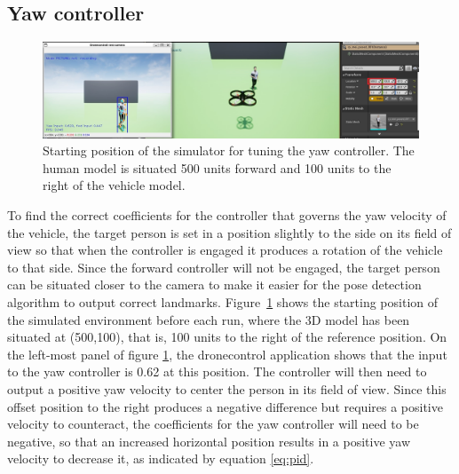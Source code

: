 \subsection{Yaw controller}


\begin{figure}
  \centering
  \includegraphics[width=\textwidth, keepaspectratio]{img/pid/tune-ref-pos-yaw.jpg}
  \caption{Starting position of the simulator for tuning the yaw controller. The human model is situated 500 units forward and 100 units to the right of the vehicle model.}\label{fig:tune-ref-pos-yaw}
\end{figure}

To find the correct coefficients for the controller that governs the yaw velocity of the vehicle, the target person is set in a position slightly to the side on its field of view so that when the controller is engaged it produces a rotation of the vehicle to that side.
Since the forward controller will not be engaged, the target person can be situated closer to the camera to make it easier for the pose detection algorithm to output correct landmarks.
Figure~\ref{fig:tune-ref-pos-yaw} shows the starting position of the simulated environment before each run, where the 3D model has been situated at (500,100), that is, 100 units to the right of the reference position.
On the left-most panel of figure \ref{fig:tune-ref-pos-yaw}, the dronecontrol application shows that the input to the yaw controller is 0.62 at this position.
The controller will then need to output a positive yaw velocity to center the person in its field of view. 
Since this offset position to the right produces a negative difference but requires a positive velocity to counteract, the coefficients for the yaw controller will need to be negative, so that an increased horizontal position results in a positive yaw velocity to decrease it, as indicated by equation \ref{eq:pid}.
        

